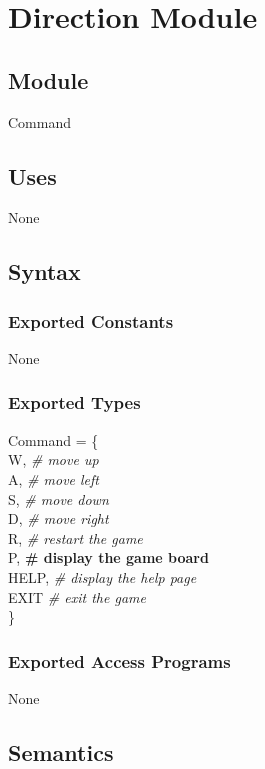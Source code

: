 \documentclass[12pt]{article}
\begin{document}
\section* {Direction Module}

\subsection*{Module}

Command

\subsection* {Uses}

None

\subsection* {Syntax}

\subsubsection* {Exported Constants}

None

\subsubsection* {Exported Types}

Command = \{\\
    W, \textit{\# move up}\\
    A, \textit{\# move left}\\
    S, \textit{\# move down}\\
    D, \textit{\# move right}\\
    R, \textit{\# restart the game}\\
    P, \textbf{\# display the game board}\\
    HELP, \textit{\# display the help page}\\
    EXIT \textit{\# exit the game}\\
\}

\subsubsection* {Exported Access Programs}

None

\subsection* {Semantics}
\end{document}
